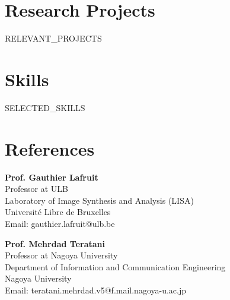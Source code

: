 \documentclass[11pt,a4paper]{article}
\begin{document}
\section*{Research Projects}
{{RELEVANT_PROJECTS}}

\section*{Skills}
{{SELECTED_SKILLS}}

\section*{References}

\begin{minipage}[t]{0.48\textwidth}
    \textbf{Prof. Gauthier Lafruit} \\
    Professor at ULB \\
    Laboratory of Image Synthesis and Analysis (LISA) \\
    Université Libre de Bruxelles \\
    Email: gauthier.lafruit@ulb.be
\end{minipage}%
\hfill
\begin{minipage}[t]{0.48\textwidth}
    \textbf{Prof. Mehrdad Teratani} \\
    Professor at Nagoya University \\
    Department of Information and Communication Engineering \\
    Nagoya University \\
    Email: teratani.mehrdad.v5@f.mail.nagoya-u.ac.jp
\end{minipage}
\end{document}

